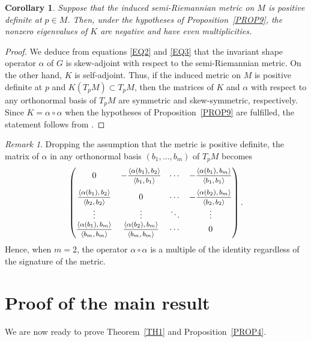 \documentclass[a4paper,12pt,oneside]{amsart}
\theoremstyle{plain}
\newtheorem{corollary}[theorem]{Corollary}
\theoremstyle{remark}
\newtheorem{remark}[theorem]{Remark}
\theoremstyle{definition}
\begin{document}
\begin{corollary}\label{COR11}
Suppose that the induced semi-Riemannian metric on $M$ is positive definite at $p \in M$. Then, under the hypotheses of Proposition~\ref{PROP9}, the nonzero eigenvalues of $K$ are negative and have even multiplicities.
\end{corollary}
\begin{proof}
We deduce from equations \eqref{EQ2} and \eqref{EQ3} that the invariant shape operator $\alpha$ of $G$ is skew-adjoint with respect to the semi-Riemannian metric. On the other hand, $K$ is self-adjoint. Thus, if the induced metric on $M$ is positive definite at $p$ and $K(T_{p}M) \subset T_{p}M$, then the matrices of $K$ and $\alpha$ with respect to any orthonormal basis of $T_{p}M$ are symmetric and skew-symmetric, respectively. Since $K =\alpha \circ \alpha$ when the hypotheses of Proposition~\ref{PROP9} are fulfilled, the statement follows from \cite[Theorem~2]{rinehart1960}.
\end{proof}

\begin{remark}
Dropping the assumption that the metric is positive definite, the matrix of $\alpha$ in any orthonormal basis $(b_{1}, \dotsc, b_{m})$ of $T_{p}M$ becomes
\begin{equation*}
\begin{pmatrix}
0 & -\mfrac{\langle \alpha(b_{1}), b_{2}\rangle}{\langle b_{1}, b_{1} \rangle} & \cdots & -\mfrac{\langle \alpha(b_{1}), b_{m}\rangle}{\langle b_{1}, b_{1} \rangle}\\[10pt]
\mfrac{\langle \alpha(b_{1}), b_{2}\rangle}{\langle b_{2}, b_{2} \rangle} & 0 & \cdots & -\mfrac{\langle \alpha(b_{2}), b_{m}\rangle}{\langle b_{2}, b_{2} \rangle}\\
\vdots & \vdots & \ddots & \vdots\\
\mfrac{\langle \alpha(b_{1}), b_{m}\rangle}{\langle b_{m}, b_{m} \rangle} & \mfrac{\langle \alpha(b_{2}), b_{m}\rangle}{\langle b_{m}, b_{m} \rangle} & \cdots & 0
\end{pmatrix}.
\end{equation*}
Hence, when $m=2$, the operator $\alpha \circ \alpha$ is a multiple of the identity regardless of the signature of the metric.
\end{remark}

\section{Proof of the main result} \label{PROOF}
We are now ready to prove Theorem~\ref{TH1} and Proposition~\ref{PROP4}.
\end{document}
